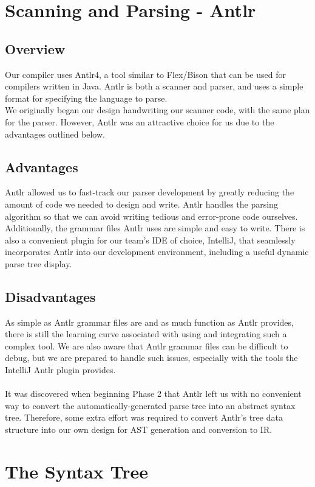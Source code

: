 \documentclass{scrartcl}
\begin{document}
\section{Scanning and Parsing - Antlr}
\subsection{Overview}
Our compiler uses Antlr4, a tool similar to Flex/Bison that can be used for compilers written in Java. Antlr is both a scanner and parser, and uses a simple format for specifying the language to parse.\\
We originally began our design handwriting our scanner code, with the same plan for the parser. However, Antlr was an attractive choice for us due to the advantages outlined below.
\subsection{Advantages}
Antlr allowed us to fast-track our parser development by greatly reducing the amount of code we needed to design and write. Antlr handles the parsing algorithm so that we can avoid writing tedious and error-prone code ourselves. Additionally, the grammar files Antlr uses are simple and easy to write. There is also a convenient plugin for our team's IDE of choice, IntelliJ, that seamlessly incorporates Antlr into our development environment, including a useful dynamic parse tree display.
\subsection{Disadvantages}
As simple as Antlr grammar files are and as much function as Antlr provides, there is still the learning curve associated with using and integrating such a complex tool. We are also aware that Antlr grammar files can be difficult to debug, but we are prepared to handle such issues, especially with the tools the IntelliJ Antlr plugin provides.\\
\\
It was discovered when beginning Phase 2 that Antlr left us with no convenient way to convert the automatically-generated parse tree into an abstract syntax tree. Therefore, some extra effort was required to convert Antlr's tree data structure into our own design for AST generation and conversion to IR.

\section{The Syntax Tree}
\end{document}
